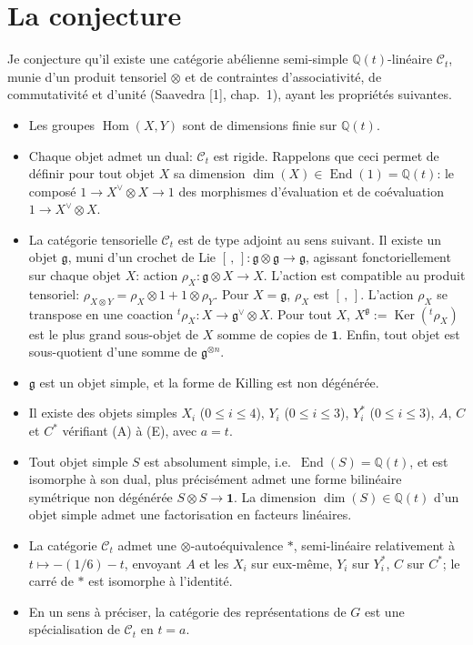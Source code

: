 \documentclass[11pt,a4paper]{article}
\DeclareMathOperator{\Hom}{Hom}
\DeclareMathOperator{\Ker}{Ker}
\DeclareMathOperator{\End}{End}
\newcommand{\frg}{\mathfrak{g}}
\newcommand{\Q}{\mathbb{Q}}
\begin{document}
\section*{La conjecture}

Je conjecture qu'il existe une cat\'egorie ab\'elienne semi-simple $\Q(t)$-lin\'eaire $\mathcal{C}_t$, munie d'un produit tensoriel $\otimes$ et de contraintes d'associativit\'e, de commutativit\'e et d'unit\'e (Saavedra [1], chap.~1), ayant les propri\'et\'es suivantes.

\begin{itemize}
\item[(i)] Les groupes $\Hom(X, Y)$ sont de dimensions finie sur $\Q(t)$.

\item[(ii)] Chaque objet admet un dual: $\mathcal{C}_t$ est rigide. Rappelons que ceci permet de d\'efinir pour tout objet $X$ sa dimension $\dim(X) \in \End(1) = \Q(t)$: le compos\'e $1 \to X^\vee \otimes X \to 1$ des morphismes d'\'evaluation et de co\'evaluation $1 \to X^\vee \otimes X$.

\item[(iii)] La cat\'egorie tensorielle $\mathcal{C}_t$ est de type adjoint au sens suivant. Il existe un objet $\frg$, muni d'un crochet de Lie $[\, , \,]: \frg \otimes \frg \to \frg$, agissant fonctoriellement sur chaque objet $X$: action $\rho_X: \frg \otimes X \to X$. L'action est compatible au produit tensoriel: $\rho_{X \otimes Y} = \rho_X \otimes 1 + 1 \otimes \rho_Y$. Pour $X = \frg$, $\rho_X$ est $[\, , \,]$. L'action $\rho_X$ se transpose en une coaction $^t\!\rho_X: X \to \frg^\vee \otimes X$. Pour tout $X$, $X^\frg := \Ker({}^t\!\rho_X)$ est le plus grand sous-objet de $X$ somme de copies de $\mathbf{1}$. Enfin, tout objet est sous-quotient d'une somme de $\frg^{\otimes n}$.

\item[(iv)] $\frg$ est un objet simple, et la forme de Killing est non d\'eg\'en\'er\'ee.

\item[(v)] Il existe des objets simples $X_i$ ($0 \leq i \leq 4$), $Y_i$ ($0 \leq i \leq 3$), $Y_i^*$ ($0 \leq i \leq 3$), $A$, $C$ et $C^*$ v\'erifiant (A) \`a (E), avec $a = t$.

\item[(vi)] Tout objet simple $S$ est absolument simple, i.e.~$\End(S) = \Q(t)$, et est isomorphe \`a son dual, plus pr\'ecis\'ement admet une forme bilin\'eaire sym\'etrique non d\'eg\'en\'er\'ee $S \otimes S \to \mathbf{1}$. La dimension $\dim(S) \in \Q(t)$ d'un objet simple admet une factorisation en facteurs lin\'eaires.

\item[(vii)] La cat\'egorie $\mathcal{C}_t$ admet une $\otimes$-auto\'equivalence $*$, semi-lin\'eaire relativement \`a $t \mapsto -(1/6) - t$, envoyant $A$ et les $X_i$ sur eux-m\^eme, $Y_i$ sur $Y_i^*$, $C$ sur $C^*$; le carr\'e de $*$ est isomorphe \`a l'identit\'e.

\item[(viii)] En un sens \`a pr\'eciser, la cat\'egorie des repr\'esentations de $G$ est une sp\'ecialisation de $\mathcal{C}_t$ en $t = a$.
\end{itemize}
\end{document}
